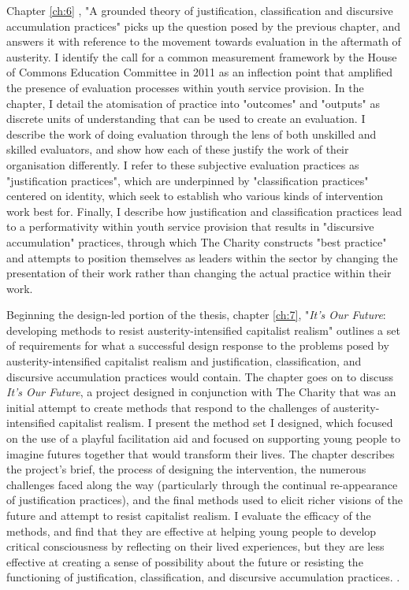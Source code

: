 Chapter \ref{ch:6} , "A grounded theory of justification, classification and discursive accumulation practices"  picks up the question posed by the previous chapter, and answers it with reference to the movement towards evaluation in the aftermath of austerity. I identify the call for a common measurement framework by the House of Commons Education Committee in 2011 as an inflection point that amplified the presence of evaluation processes within youth service provision. In the chapter, I detail the atomisation of practice into "outcomes" and "outputs" as discrete units of understanding that can be used to create an evaluation. I describe the work of doing evaluation through the lens of both unskilled and skilled evaluators, and show how each of these justify the work of their organisation differently. I refer to these subjective evaluation practices as "justification practices", which are underpinned by "classification practices" centered on identity, which seek to establish who various kinds of intervention work best for. Finally, I describe how justification and classification practices lead to a performativity within youth service provision that results in "discursive accumulation" practices, through which The Charity constructs "best practice" and attempts to position themselves as leaders within the sector by changing the presentation of their work rather than changing the actual practice within their work. 

Beginning the design-led portion of the thesis, chapter \ref{ch:7}, "\textit{It's Our Future}: developing methods to resist austerity-intensified capitalist realism" outlines a set of requirements for what a successful design response to the problems posed by austerity-intensified capitalist realism and justification, classification, and discursive accumulation practices would contain. The chapter goes on to discuss \textit{It's Our Future}, a project designed in conjunction with The Charity that was an initial attempt to create methods that respond to the challenges of austerity-intensified capitalist realism. I present the method set I designed, which focused on the use of a playful facilitation aid and focused on supporting young people to imagine futures together that would transform their lives. The chapter describes the project's brief, the process of designing the intervention, the numerous challenges faced along the way (particularly through the continual re-appearance of justification practices), and the final methods used to elicit richer visions of the future and attempt to resist capitalist realism. I evaluate the efficacy of the methods, and find that they are effective at helping young people to develop critical consciousness by reflecting on their lived experiences, but they are less effective at creating a sense of possibility about the future or resisting the functioning of justification, classification, and discursive accumulation practices. . 

